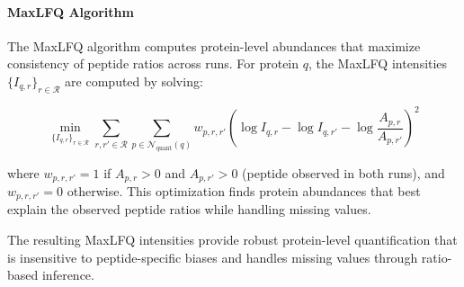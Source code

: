 \documentclass{article}
\begin{document}
\paragraph{MaxLFQ Algorithm} The MaxLFQ algorithm computes protein-level abundances that maximize consistency of peptide ratios across runs. For protein $q$, the MaxLFQ intensities $\{I_{q,r}\}_{r \in \mathcal{R}}$ are computed by solving:

\begin{equation}
\min_{\{I_{q,r}\}_{r \in \mathcal{R}}} \sum_{r,r' \in \mathcal{R}} \sum_{p \in \mathcal{N}_{\text{quant}}(q)} w_{p,r,r'} \left( \log I_{q,r} - \log I_{q,r'} - \log \frac{A_{p,r}}{A_{p,r'}} \right)^2
\end{equation}

where $w_{p,r,r'} = 1$ if $A_{p,r} > 0$ and $A_{p,r'} > 0$ (peptide observed in both runs), and $w_{p,r,r'} = 0$ otherwise. This optimization finds protein abundances that best explain the observed peptide ratios while handling missing values.

The resulting MaxLFQ intensities provide robust protein-level quantification that is insensitive to peptide-specific biases and handles missing values through ratio-based inference.
\end{document}
